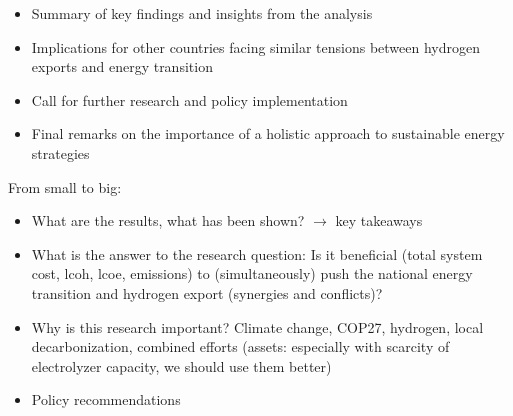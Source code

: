 \begin{itemize}
    \item Summary of key findings and insights from the analysis
    \item Implications for other countries facing similar tensions between hydrogen exports and energy transition
    \item Call for further research and policy implementation
    \item Final remarks on the importance of a holistic approach to sustainable energy strategies
\end{itemize}

From small to big:
\begin{itemize}
    \item What are the results, what has been shown? $\rightarrow$ key takeaways
    \item What is the answer to the research question: Is it beneficial (total system cost, lcoh, lcoe, emissions)
    to (simultaneously) push the national energy transition
    and hydrogen export (synergies and conflicts)?
    \item Why is this research important? Climate change, COP27, hydrogen, local decarbonization, combined efforts (assets: especially with scarcity of electrolyzer capacity, we should use them better)
    \item Policy recommendations
\end{itemize}
